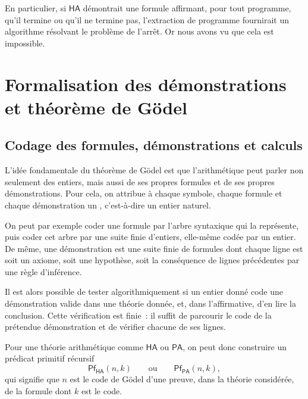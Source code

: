 En particulier, si $\mathsf{HA}$ démontrait une formule affirmant, pour
tout programme, qu'il termine ou qu'il ne termine pas, l'extraction de
programme fournirait un algorithme résolvant le problème de l'arrêt.  Or
nous avons vu que cela est impossible.


\section{Formalisation des démonstrations et théorème de Gödel}

\subsection{Codage des formules, démonstrations et calculs}

\thingy
L'idée fondamentale du théorème de Gödel est que l'arithmétique peut
parler non seulement des entiers, mais aussi de ses propres formules et
de ses propres démonstrations.  Pour cela, on attribue à chaque symbole,
chaque formule et chaque démonstration un , c'est-à-dire
un entier naturel.

On peut par exemple coder une formule par l'arbre syntaxique qui la
représente, puis coder cet arbre par une suite finie d'entiers, elle-même
codée par un entier.  De même, une démonstration est une suite finie de
formules dont chaque ligne est soit un axiome, soit une hypothèse, soit
la conséquence de lignes précédentes par une règle d'inférence.

\thingy
Il est alors possible de tester algorithmiquement si un entier donné code
une démonstration valide dans une théorie donnée, et, dans l'affirmative,
d'en lire la conclusion.  Cette vérification est finie : il suffit de
parcourir le code de la prétendue démonstration et de vérifier chacune de
ses lignes.

Pour une théorie arithmétique comme $\mathsf{HA}$ ou $\mathsf{PA}$, on
peut donc construire un prédicat primitif récursif
\[
\mathsf{Pf}_{\mathsf{HA}}(n,k)
\qquad\text{ou}\qquad
\mathsf{Pf}_{\mathsf{PA}}(n,k),
\]
qui signifie que $n$ est le code de Gödel d'une preuve, dans la théorie
considérée, de la formule dont $k$ est le code.

